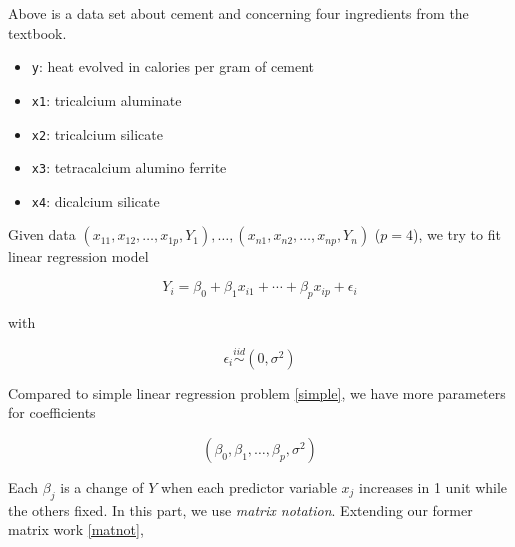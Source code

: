 \documentclass[]{book}
\providecommand{\tightlist}{%
  \setlength{\itemsep}{0pt}\setlength{\parskip}{0pt}}
\theoremstyle{definition}
\theoremstyle{definition}
\theoremstyle{definition}
\theoremstyle{remark}
\begin{document}
Above is a data set about cement and concerning four ingredients from the \citet{Montgomery:2015aa} textbook.

\begin{itemize}
\tightlist
\item
  \texttt{y}: heat evolved in calories per gram of cement
\item
  \texttt{x1}: tricalcium aluminate
\item
  \texttt{x2}: tricalcium silicate
\item
  \texttt{x3}: tetracalcium alumino ferrite
\item
  \texttt{x4}: dicalcium silicate
\end{itemize}

Given data \((x_{11}, x_{12}, \ldots, x_{1p}, Y_1), \ldots, (x_{n1}, x_{n2}, \ldots, x_{np}, Y_n)\) (\(p = 4\)), we try to fit linear regression model

\[Y_i = \beta_0 + \beta_1 x_{i1} + \cdots + \beta_p x_{ip} + \epsilon_{i}\]

with

\[\epsilon_i \stackrel{iid}{\sim}(0, \sigma^2)\]

Compared to simple linear regression problem \ref{simple}, we have more parameters for coefficients

\[(\beta_0, \beta_1, \ldots, \beta_p, \sigma^2)\]

Each \(\beta_j\) is a change of \(Y\) when each predictor variable \(x_j\) increases in 1 unit while the others fixed. In this part, we use \emph{matrix notation}. Extending our former matrix work \ref{matnot},
\end{document}
